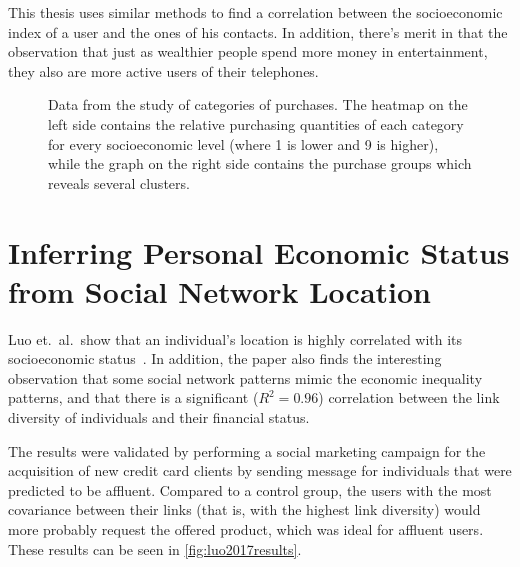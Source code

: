 This thesis uses similar methods to find a correlation between the socioeconomic index of a user and the ones of his contacts. In addition, there's merit in that the observation that just as wealthier people spend more money in entertainment, they also are more active users of their telephones.

\begin{figure}
\centering
\begin{subfigure}[t]{.45\textwidth}
\label{fig:service_socioeconomic}
\end{subfigure}
\begin{subfigure}[t]{.45\textwidth}
\label{fig:service_service}
\end{subfigure}
\caption{Data from the study of categories of purchases. The heatmap on the left side contains the relative purchasing quantities of each category for every socioeconomic level (where 1 is lower and 9 is higher), while the graph on the right side contains the purchase groups which reveals several clusters.}
\label{fig:paper_yannick}
\end{figure}

\section{Inferring Personal Economic Status from Social Network Location}
\label{sec:luo2017inferring}

Luo et.\ al.\ show that an individual's location is highly correlated with its socioeconomic status~\cite{Luo2017inferring}.
In addition, the paper also finds the interesting observation that some social network patterns mimic the economic inequality patterns, and that there is a significant ($R^2 = 0.96$) correlation between the link diversity of individuals and their financial status.

The results were validated by performing a social marketing campaign for the acquisition of new credit card clients by sending message for individuals that were predicted to be affluent.
Compared to a control group, the users with the most covariance between their links (that is, with the highest link diversity) would more probably request the offered product, which was ideal for affluent users. These results can be seen in \cref{fig:luo2017results}.

